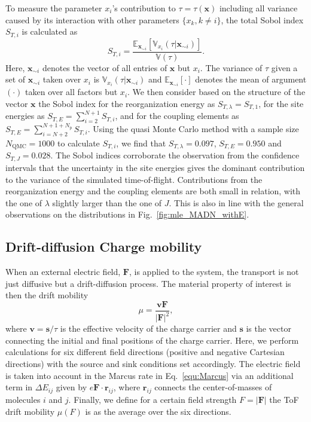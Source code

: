 \documentclass[%
 reprint,
superscriptaddress,
 amsmath,amssymb,
 aps,
prb,
floatfix
]{revtex4-2}
\begin{document}
To measure the parameter $x_i$'s contribution to $\tau=\tau(\mathbf{x})$ including all variance caused by its interaction with other parameters $\{x_k, k \neq i \}$, the total Sobol index $S_{T,i}$ is calculated as
%
\begin{equation}
    S_{T,i} = \frac{ \mathbb{E}_{\mathbf{x}_{\sim i}}[ \mathbb{V}_{x_i}(\tau|\mathbf{x}_{\sim i}) ] }{ \mathbb{V}(\tau) } .
    \label{eq:STi}
\end{equation}
%
Here, $\mathbf{x}_{\sim i}$ denotes the vector of all entries of $\mathbf{x}$ but $x_i$. The variance of $\tau$ given a set of $\mathbf{x}_{\sim i}$ taken over $x_i$ is $\mathbb{V}_{x_i}(\tau|\mathbf{x}_{\sim i})$ and $ \mathbb{E}_{\mathbf{x}_{\sim i}}[\cdot]$ denotes the mean of argument $(\cdot)$ taken over all factors but $x_i$. We then consider based on the structure of the vector $\mathbf{x}$ the Sobol index for the reorganization energy as $S_{T,\lambda} = S_{T,1}$, for the site energies as $S_{T,E} = \sum\limits_{i=2}^{N+1} S_{T,i}$, and for the coupling elements as $S_{T,E} = \sum\limits_{i=N+2}^{N+1+N_\text{p}} S_{T,i}$. Using the quasi Monte Carlo method\cite{sobol_global_2001} with a sample size $N_\text{QMC}=1000$ to calculate $S_{T,i}$, we find that $S_{T,\lambda}=0.097$, $S_{T,E} =0.950$ and $S_{T,J}=0.028$. The Sobol indices corroborate the observation from the confidence intervals that the uncertainty in the site energies gives the dominant contribution to the variance of the simulated time-of-flight. Contributions from the reorganization energy and the coupling elements are both small in relation, with the one of $\lambda$ slightly larger than the one of $J$. This is also in line with the general observations on the distributions in Fig.~\ref{fig:mle_MADN_withE}.

\subsection{Drift-diffusion Charge mobility}
When an external electric field, $\mathbf{F}$, is applied to the system, the transport is not just diffusive but a drift-diffusion process. The material property of interest is then the drift mobility
%
\begin{equation}
    \mu = \frac{\mathbf{v} \mathbf{F} }{ |\mathbf{F}|^2},
    \label{eq:mu}
\end{equation}
%
where $\mathbf{v} = \mathbf{s}/{\tau}$ is the effective velocity of the charge carrier and $\mathbf{s}$ is the vector connecting the initial and final positions of the charge carrier. Here, we perform calculations for six different field directions (positive and negative Cartesian directions) with the source and sink conditions set accordingly. The electric field is taken into account in the Marcus rate in Eq.~\ref{equ:Marcus} via an additional term in $\Delta E_{ij}$ given by $e\mathbf{F} \cdot \mathbf{r}_{ij}$, where $\mathbf{r}_{ij}$ connects the center-of-masses of molecules $i$ and $j$. Finally, we define for a certain field strength $F=\vert\mathbf{F}\vert$ the ToF drift mobility $\mu(F)$ is as the average over the six directions. 
\end{document}
